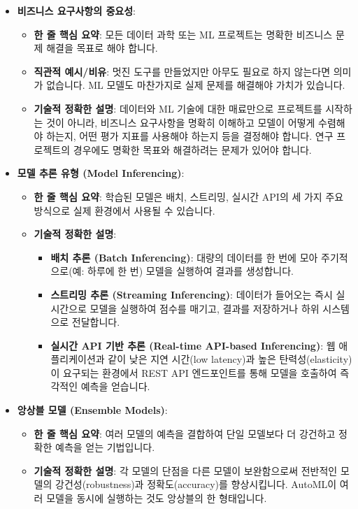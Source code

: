 \documentclass[11pt,a4paper]{article}
\theoremstyle{definition}
\begin{document}
\begin{itemize}
    \item \textbf{비즈니스 요구사항의 중요성}:
    \begin{itemize}
        \item \textbf{한 줄 핵심 요약}: 모든 데이터 과학 또는 ML 프로젝트는 명확한 비즈니스 문제 해결을 목표로 해야 합니다.
        \item \textbf{직관적 예시/비유}: 멋진 도구를 만들었지만 아무도 필요로 하지 않는다면 의미가 없습니다. ML 모델도 마찬가지로 실제 문제를 해결해야 가치가 있습니다.
        \item \textbf{기술적 정확한 설명}: 데이터와 ML 기술에 대한 매료만으로 프로젝트를 시작하는 것이 아니라, 비즈니스 요구사항을 명확히 이해하고 모델이 어떻게 수렴해야 하는지, 어떤 평가 지표를 사용해야 하는지 등을 결정해야 합니다. 연구 프로젝트의 경우에도 명확한 목표와 해결하려는 문제가 있어야 합니다.
    \end{itemize}

    \item \textbf{모델 추론 유형 (Model Inferencing)}:
    \begin{itemize}
        \item \textbf{한 줄 핵심 요약}: 학습된 모델은 배치, 스트리밍, 실시간 API의 세 가지 주요 방식으로 실제 환경에서 사용될 수 있습니다.
        \item \textbf{기술적 정확한 설명}:
        \begin{itemize}
            \item \textbf{배치 추론 (Batch Inferencing)}: 대량의 데이터를 한 번에 모아 주기적으로(예: 하루에 한 번) 모델을 실행하여 결과를 생성합니다.
            \item \textbf{스트리밍 추론 (Streaming Inferencing)}: 데이터가 들어오는 즉시 실시간으로 모델을 실행하여 점수를 매기고, 결과를 저장하거나 하위 시스템으로 전달합니다.
            \item \textbf{실시간 API 기반 추론 (Real-time API-based Inferencing)}: 웹 애플리케이션과 같이 낮은 지연 시간(low latency)과 높은 탄력성(elasticity)이 요구되는 환경에서 REST API 엔드포인트를 통해 모델을 호출하여 즉각적인 예측을 얻습니다.
        \end{itemize}
    \end{itemize}

    \item \textbf{앙상블 모델 (Ensemble Models)}:
    \begin{itemize}
        \item \textbf{한 줄 핵심 요약}: 여러 모델의 예측을 결합하여 단일 모델보다 더 강건하고 정확한 예측을 얻는 기법입니다.
        \item \textbf{기술적 정확한 설명}: 각 모델의 단점을 다른 모델이 보완함으로써 전반적인 모델의 강건성(robustness)과 정확도(accuracy)를 향상시킵니다. AutoML이 여러 모델을 동시에 실행하는 것도 앙상블의 한 형태입니다.
    \end{itemize}


\end{itemize}
\end{document}
